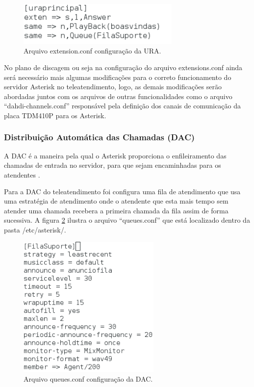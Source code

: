\begin{figure}[h]
	\centering
	\includegraphics[width=8cm]{imagens/ura.png}
	\caption{Arquivo extension.conf configuração da URA.}
    \label{Figura19}
\end{figure}

No plano de discagem ou seja na configuração do arquivo extensions.conf ainda será necessário mais algumas modificações para o correto funcionamento do servidor Asterisk no teleatendimento, logo, as demais modificações serão abordadas juntos com os arquivos de outras funcionalidades como o arquivo ``dahdi-channels.conf''  responsável pela definição dos canais de comunicação da placa TDM410P para os Asterisk.

\subsubsection{Distribuição Automática das Chamadas (DAC)}
A DAC é a maneira pela qual o Asterisk proporciona o enfileiramento das chamadas de entrada no servidor, para que sejam encaminhadas para os atendentes \cite{books/daglib/0018909}.

Para a DAC do teleatendimento foi configura uma fila de atendimento que usa uma estratégia de atendimento onde o atendente que esta mais tempo sem atender uma chamada recebera a primeira chamada da fila assim de forma sucessiva. A figura \ref{Figura20} ilustra o arquivo ``queues.conf'' que está localizado dentro da pasta /etc/asterisk/.

\begin{figure}[h]
	\centering
	\includegraphics[width=7cm]{imagens/dac.png}
	\caption{Arquivo queues.conf configuração da DAC.}
    \label{Figura20}
\end{figure}

